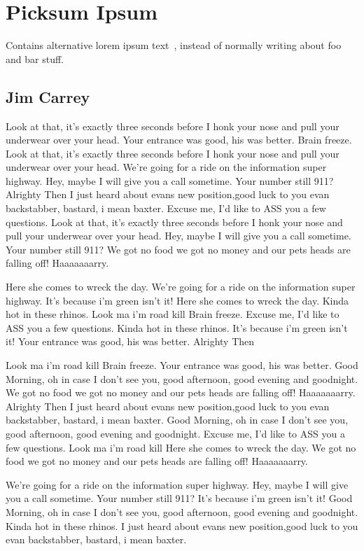 \documentclass[thesis.tex]{subfiles}
\begin{document}
\chapter{Picksum Ipsum}

Contains alternative lorem ipsum text~\cite{ipsum}, instead of normally writing
about \gls{foo} and \gls{bar} stuff.

\section{Jim Carrey}
Look at that, it's exactly three seconds before I honk your nose and pull your underwear over your head. Your entrance was good, his was better. Brain freeze. Look at that, it's exactly three seconds before I honk your nose and pull your underwear over your head. We're going for a ride on the information super highway. Hey, maybe I will give you a call sometime. Your number still 911? Alrighty Then I just heard about evans new position,good luck to you evan backstabber, bastard, i mean baxter. Excuse me, I'd like to ASS you a few questions. Look at that, it's exactly three seconds before I honk your nose and pull your underwear over your head. Hey, maybe I will give you a call sometime. Your number still 911? We got no food we got no money and our pets heads are falling off! Haaaaaaarry.

Here she comes to wreck the day. We're going for a ride on the information super highway. It's because i'm green isn't it! Here she comes to wreck the day. Kinda hot in these rhinos. Look ma i'm road kill Brain freeze. Excuse me, I'd like to ASS you a few questions. Kinda hot in these rhinos. It's because i'm green isn't it! Your entrance was good, his was better. Alrighty Then

Look ma i'm road kill Brain freeze. Your entrance was good, his was better. Good Morning, oh in case I don't see you, good afternoon, good evening and goodnight. We got no food we got no money and our pets heads are falling off! Haaaaaaarry. Alrighty Then I just heard about evans new position,good luck to you evan backstabber, bastard, i mean baxter. Good Morning, oh in case I don't see you, good afternoon, good evening and goodnight. Excuse me, I'd like to ASS you a few questions. Look ma i'm road kill Here she comes to wreck the day. We got no food we got no money and our pets heads are falling off! Haaaaaaarry.

We're going for a ride on the information super highway. Hey, maybe I will give you a call sometime. Your number still 911? It's because i'm green isn't it! Good Morning, oh in case I don't see you, good afternoon, good evening and goodnight. Kinda hot in these rhinos. I just heard about evans new position,good luck to you evan backstabber, bastard, i mean baxter.
\end{document}
